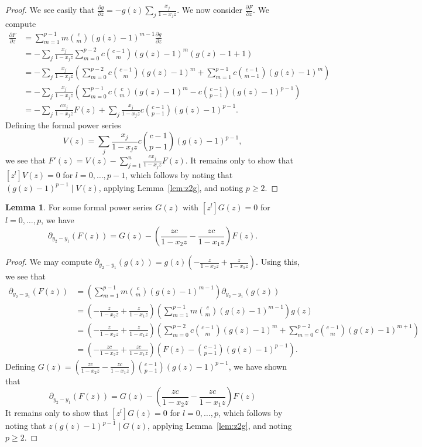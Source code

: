 \documentclass{elsarticle}
\numberwithin{equation}{section}
\theoremstyle{definition}
\newtheorem{lemma}[theorem]{Lemma}
\begin{document}
\begin{proof}
We see easily that $\frac{\partial g}{\partial z} = -g(z) \sum_j \frac{x_j}{1-x_jz}$. We now consider $\frac{\partial F}{\partial z}$. We compute
\begin{align*}
\frac{\partial F}{\partial z}
&=\sum_{m=1}^{p-1}m\binom{c}{m}(g(z)-1)^{m-1}\frac{\partial g}{\partial z}\\
&=-\sum_j \frac{x_j}{1-x_jz}\sum_{m=0}^{p-2}c\binom{c-1}{m}(g(z)-1)^{m}(g(z)-1+1)\\
&=-\sum_j \frac{x_j}{1-x_jz}\left(\sum_{m=0}^{p-2}c\binom{c-1}{m}(g(z)-1)^{m}+\sum_{m=1}^{p-1}c\binom{c-1}{m-1}(g(z)-1)^{m}\right)\\
&=-\sum_j \frac{x_j}{1-x_jz}\left(\sum_{m=0}^{p-1}c\binom{c}{m}(g(z)-1)^{m}-c\binom{c-1}{p-1}(g(z)-1)^{p-1}\right)\\
&=-\sum_j \frac{cx_j}{1-x_jz}F(z)+\sum_j \frac{x_j}{1-x_jz}c\binom{c-1}{p-1}(g(z)-1)^{p-1}.
\end{align*}
Defining the formal power series
\[
V(z)=\sum_j \frac{x_j}{1-x_jz}c\binom{c-1}{p-1}(g(z)-1)^{p-1},
\]
we see that $F'(z) = V(z) - \sum_{j=1}^{n} \frac{cx_j}{1-x_jz} F(z)$. It remains only to show that $[z^l]V(z)=0$ for $l=0,\dots,p-1$, which follows by noting that $(g(z)-1)^{p-1} \mid V(z)$, applying Lemma~\ref{lem:z2g}, and noting $p \ge 2$.
\end{proof}

\begin{lemma}\label{lem:dFdxi} 
For some formal power series $G(z)$ with $[z^l]G(z)=0$ for $l=0,\dots,p$, we have
\[
\partial_{y_2-y_1}(F(z))= G(z) - \left(\frac{zc}{1-x_2z}-\frac{zc}{1-x_1z}\right)F(z).
\]
\end{lemma}
\begin{proof}
We may compute $\partial_{y_2-y_1}(g(z))=g(z)\left(-\frac{z}{1-x_2z}+\frac{z}{1-x_1z}\right)$. Using this, we see that
\begin{align*}
\partial_{y_2-y_1}(F(z))&=\left(\sum_{m=1}^{p-1}m\binom{c}{m}(g(z)-1)^{m-1}\right)\partial_{y_2-y_1}(g(z))\\
&=\left(-\frac{z}{1-x_2z}+\frac{z}{1-x_1z}\right)\left(\sum_{m=1}^{p-1}m\binom{c}{m}(g(z)-1)^{m-1}\right)g(z)\\
&=\left(-\frac{z}{1-x_2z}+\frac{z}{1-x_1z}\right)\left(\sum_{m=0}^{p-2}c\binom{c-1}{m}(g(z)-1)^{m}+\sum_{m=0}^{p-2}c\binom{c-1}{m}(g(z)-1)^{m+1}\right)\\
&=\left(-\frac{zc}{1-x_2z}+\frac{zc}{1-x_1z}\right)\left(F(z)-\binom{c-1}{p-1}(g(z)-1)^{p-1}\right).
\end{align*}
Defining $G(z)=\left(\frac{zc}{1-x_2z}- \frac{zc}{1-x_1z}\right)\binom{c-1}{p-1}(g(z)-1)^{p-1}$, we have shown that
\[
\partial_{y_2-y_1}(F(z))= G(z) - \left(\frac{zc}{1-x_2z}-\frac{zc}{1-x_1z}\right)F(z)
\]
It remains only to show that $[z^l]G(z)=0$ for $l=0,\dots,p$, which follows by noting that $z(g(z)-1)^{p-1} \mid G(z)$, applying Lemma~\ref{lem:z2g}, and noting $p \geq 2$.
\end{proof}
\end{document}
